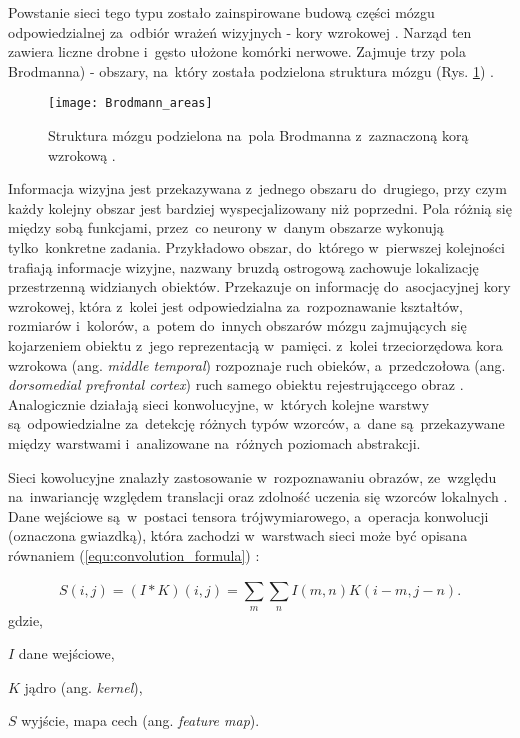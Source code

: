 {\parindent0pt %
Powstanie sieci tego typu zostało zainspirowane budową części mózgu odpowiedzialnej za~odbiór wrażeń wizyjnych - kory wzrokowej \cite{Matsugu2003SubjectIF}. Narząd ten zawiera liczne drobne i~gęsto ułożone komórki nerwowe. Zajmuje trzy pola Brodmanna) - obszary, na~który została podzielona struktura mózgu (Rys. \ref{fig:brodmann_areas}) \cite{Brodmann1985VergleichendeLD}. 

\begin{figure}[h!]
	\centering
	\centering
		\texttt{[image: Brodmann\_areas]}	
	\caption{Struktura mózgu podzielona na~pola Brodmanna z~zaznaczoną korą wzrokową \cite{brodmann_areas}.}
	\label{fig:brodmann_areas}
\end{figure}

Informacja wizyjna jest przekazywana z~jednego obszaru do~drugiego, przy czym każdy kolejny obszar jest bardziej wyspecjalizowany niż poprzedni. Pola różnią się między sobą funkcjami, przez~co neurony w~danym obszarze wykonują tylko~konkretne zadania. Przykładowo obszar, do~którego w~pierwszej kolejności trafiają informacje wizyjne, nazwany bruzdą ostrogową zachowuje lokalizację przestrzenną widzianych obiektów. Przekazuje on informację do~asocjacyjnej kory wzrokowej, która z~kolei jest odpowiedzialna za~rozpoznawanie kształtów, rozmiarów i~kolorów, a~potem do~innych obszarów mózgu zajmujących się kojarzeniem obiektu z~jego reprezentacją w~pamięci. z~kolei trzeciorzędowa kora wzrokowa (ang. \textit{middle temporal}) rozpoznaje ruch obieków, a~przedczołowa (ang. \textit{dorsomedial prefrontal cortex}) ruch samego obiektu rejestrująccego obraz \cite{cnn_website}. Analogicznie działają sieci konwolucyjne, w~których kolejne warstwy są~odpowiedzialne za~detekcję różnych typów wzorców, a~dane są~przekazywane między warstwami i~analizowane na~różnych poziomach abstrakcji.

Sieci kowolucyjne znalazły zastosowanie w~rozpoznawaniu obrazów, ze~względu na~inwariancję względem translacji oraz zdolność uczenia się wzorców lokalnych \cite{Chollet2017DeepLW}. Dane wejściowe są~w~postaci tensora trójwymiarowego, a~operacja konwolucji (oznaczona gwiazdką), która zachodzi w~warstwach sieci może być opisana równaniem (\ref{equ:convolution_formula}) \cite{deep_learning}:

\begin{equation}
S(i,j) = (I * K)(i,j) = \sum_{m}^{}\sum_{n}^{} I(m,n)K(i-m,j-n).
\label{equ:convolution_formula}
\end{equation}
gdzie,
\begin{eqwhere}[2cm]
	\item[$I$] dane wejściowe,
	\item[$K$] jądro (ang. \textit{kernel}),
	\item[$S$] wyjście, mapa cech (ang. \textit{feature map}).
\end{eqwhere}
}

